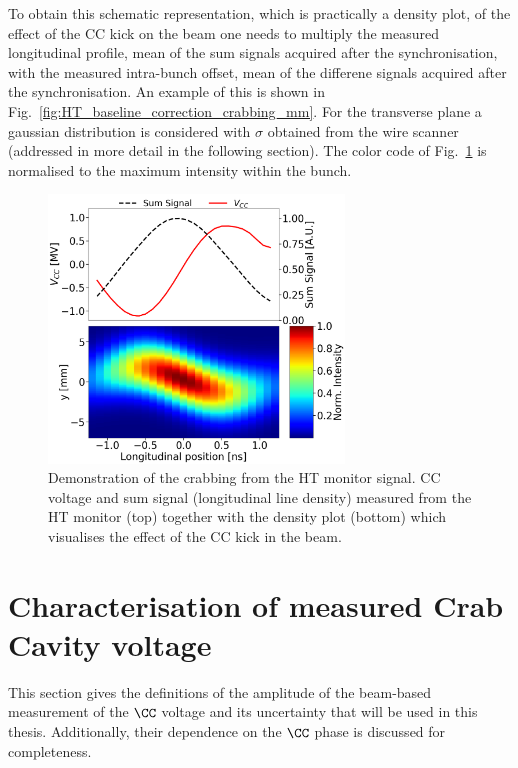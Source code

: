 To obtain this schematic representation, which is practically a density plot, of the effect of the CC kick on the beam one needs to multiply the measured longitudinal profile, mean of the sum signals acquired after the synchronisation, with the measured intra-bunch offset, mean of the differene signals acquired after the synchronisation. An example of this is shown in Fig.~\ref{fig:HT_baseline_correction_crabbing_mm}. For the transverse plane a gaussian distribution is considered with $\sigma$ obtained from the wire scanner (addressed in more detail in the following section). The color code of Fig.~\ref{fig:crabbing_reconstruction_HT_monitor} is normalised to the maximum intensity within the bunch.

\begin{figure}[!h]
   \centering         
   \includegraphics[width=0.7\textwidth]{images/Ch4/HT_crabVoltage__20180530_135105_crabbing_only.png}
       \caption{Demonstration of the crabbing from the HT monitor signal. CC voltage and sum signal (longitudinal line density) measured from the HT monitor (top) together with the density plot (bottom) which visualises the effect of the CC kick in the beam.}
       \label{fig:crabbing_reconstruction_HT_monitor}
\end{figure}
   

\section{Characterisation of measured Crab Cavity voltage}\label{sec:CC_voltage_meas}
This section gives the definitions of the amplitude of the beam-based measurement of the $\CC$ voltage and its uncertainty that will be used in this thesis. Additionally, their dependence on the $\CC$ phase is discussed for completeness.


